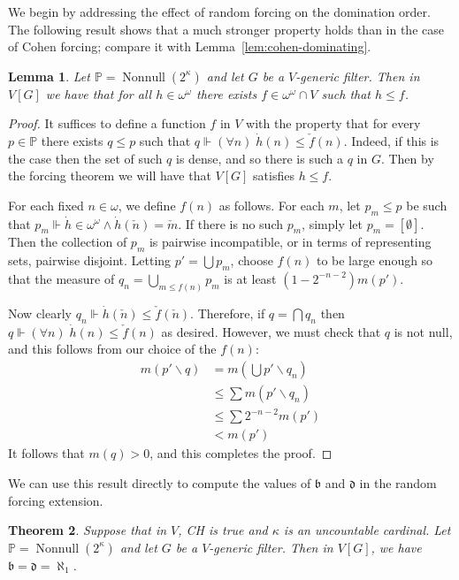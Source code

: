 \documentclass[11pt,oneside]{amsbook}
\newcommand{\PP}{\mathbb P}
\newcommand{\forces}{\Vdash}
\DeclareMathOperator{\Nonnull}{Nonnull}
\theoremstyle{definition}
\theoremstyle{plain}
\newtheorem{theorem}{Theorem}[section]
\newtheorem{lemma}[theorem]{Lemma}
\theoremstyle{definition}
\theoremstyle{remark}
\numberwithin{equation}{section}
\numberwithin{figure}{section}
\begin{document}
We begin by addressing the effect of random forcing on the domination order. The following result shows that a much stronger property holds than in the case of Cohen forcing; compare it with Lemma~\ref{lem:cohen-dominating}.

\begin{lemma}
  Let $\PP=\Nonnull(2^\kappa)$ and let $G$ be a $V$-generic filter. Then in $V[G]$ we have that for all $h\in\omega^\omega$ there exists $f\in \omega^\omega\cap V$ such that $h\leq f$.
\end{lemma}

\begin{proof}
  It suffices to define a function $f$ in $V$ with the property that for every $p\in\PP$ there exists $q\leq p$ such that $q\forces(\forall n)\;\dot h(n)\leq\check f(n)$. Indeed, if this is the case then the set of such $q$ is dense, and so there is such a $q$ in $G$. Then by the forcing theorem we will have that $V[G]$ satisfies $h\leq f$.

  For each fixed $n\in\omega$, we define $f(n)$ as follows. For each $m$, let $p_m\leq p$ be such that $p_m\forces\dot h\in\omega^\omega\wedge\dot h(\check n)=\check m$. If there is no such $p_m$, simply let $p_m=[\emptyset]$. Then the collection of $p_m$ is pairwise incompatible, or in terms of representing sets, pairwise disjoint. Letting $p'=\bigcup p_m$, choose $f(n)$ to be large enough so that the measure of $q_n=\bigcup_{m\leq f(n)}p_m$ is at least $(1-2^{-n-2})m(p')$.

  Now clearly $q_n\forces\dot h(\check n)\leq\check f(\check n)$. Therefore, if $q=\bigcap q_n$ then $q\forces(\forall n)\;\dot h(n)\leq\check f(n)$ as desired. However, we must check that $q$ is not null, and this follows from our choice of the $f(n)$:
  \begin{align*}
    m(p'\smallsetminus q)&=m(\bigcup p'\smallsetminus q_n)\\
                        &\leq\sum m(p'\smallsetminus q_n)\\
                        &\leq\sum 2^{-n-2}m(p')\\
                        &<m(p')
  \end{align*}
  It follows that $m(q)>0$, and this completes the proof.
\end{proof}

We can use this result directly to compute the values of $\mathfrak b$ and $\mathfrak d$ in the random forcing extension.

\begin{theorem}
  \label{thm:random-bd}
  Suppose that in $V$, CH is true and $\kappa$ is an uncountable cardinal. Let $\PP=\Nonnull(2^\kappa)$ and let $G$ be a $V$-generic filter. Then in $V[G]$, we have $\mathfrak b=\mathfrak d=\aleph_1$.
\end{theorem}
\end{document}
